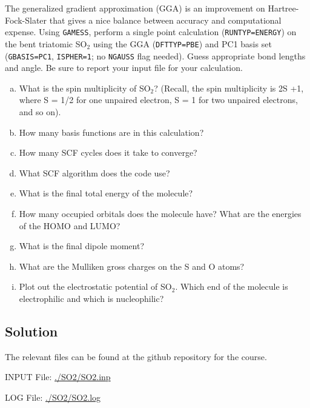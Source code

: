 \documentclass[11pt]{article}
\begin{document}
The generalized gradient approximation (GGA) is an improvement on Hartree-Fock-Slater that gives a nice balance between accuracy and computational expense. Using \texttt{GAMESS}, perform a single point calculation (\verb~RUNTYP=ENERGY~) on the bent triatomic SO$_{\text{2}}$ using the GGA (\verb~DFTTYP=PBE~) and PC1 basis set (\verb~GBASIS=PC1~, \verb~ISPHER=1~; no \verb~NGAUSS~ flag needed). Guess appropriate bond lengths and angle. Be sure to report your input file for your calculation.

\begin{enumerate}[(a)]
\item What is the spin multiplicity of SO$_{\text{2}}$? (Recall, the spin multiplicity is 2S +1, where S = 1/2 for one unpaired electron, S = 1 for two unpaired electrons, and so on).

\item How many basis functions are in this calculation?

\item How many SCF cycles does it take to converge?

\item What SCF algorithm does the code use?

\item What is the final total energy of the molecule?

\item How many occupied orbitals does the molecule have? What are the energies of the HOMO and LUMO?

\item What is the final dipole moment?

\item What are the Mulliken gross charges on the S and O atoms?

\item Plot out the electrostatic potential of SO$_{\text{2}}$. Which end of the molecule is electrophilic and which is nucleophilic?
\end{enumerate}

\subsection{Solution}
\label{sec-2-1}

The relevant files can be found at the github repository for the course.

INPUT File: \url{./SO2/SO2.inp}

LOG File: \url{./SO2/SO2.log}
\end{document}
